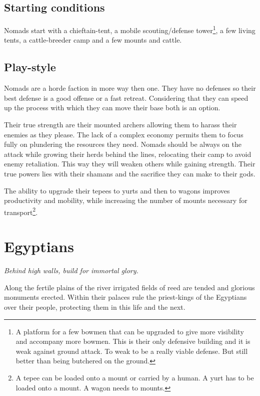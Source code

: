 \documentclass[a4paper]{book}
\begin{document}
	\subsection{Starting conditions}
		\Gls{Nomads} start with a chieftain-tent, a mobile scouting/defense tower\footnote{
		A platform for a few bowmen that can be upgraded to give more visibility
		and accompany more bowmen.
		This is their only defensive building and it is weak against ground attack.
		To weak to be a really viable defense.
		But still better than being butchered on the ground.
		}, a few living tents, a cattle-breeder camp and a few mounts and cattle.

	\subsection{Play-style}
		\Gls{Nomads} are a horde faction in more way then one.
		They have no defenses so their best defense is a good offense or a fast retreat.
		Considering that they can speed up the process with which they can move
		their base both is an option.

		Their true strength are their mounted archers allowing them to harass their enemies
		as they please.
		The lack of a complex economy permits them to focus fully on plundering
		the resources they need.
		\Gls{Nomads} should be always on the attack while growing their herds behind the lines,
		relocating their camp to avoid enemy retaliation.
		This way they will weaken others while gaining strength.
		Their true powers lies with their shamans and the sacrifice they can make to their gods.

		The ability to upgrade their tepees to yurts and then to wagons improves productivity
		and mobility, while increasing the number of mounts necessary for transport\footnote{
			A tepee can be loaded onto a mount or carried by a human.
			A yurt has to be loaded onto a mount.
			A wagon needs to mounts.
		}.

\section{\Gls{Egyptians}}

	\begin{flushright}
		\emph{Behind high walls, build for immortal glory.}
	\end{flushright}

	Along the fertile plains of the river irrigated fields of reed are tended
	and glorious monuments erected.
	Within their palaces rule the priest-kings of the \gls{Egyptians} over their
	people, protecting them in this life and the next.
\end{document}
